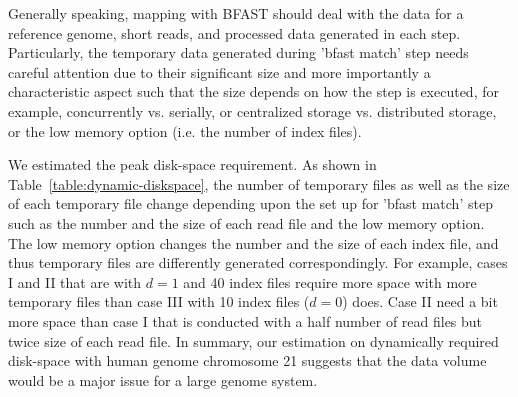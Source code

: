 \documentclass{cpeauth}
\begin{document}



Generally speaking, mapping with BFAST should deal with the data for a
reference genome, short reads, and processed data generated in each
step.  Particularly, the temporary data generated during 'bfast match'
step needs careful attention due to their significant size and more
importantly a characteristic aspect such that the size depends on how
the step is executed, for example, concurrently vs. serially, or
centralized storage vs. distributed storage, or the low memory option
(i.e. the number of index files).

We estimated the peak disk-space requirement.  As shown
in Table~\ref{table:dynamic-diskspace}, the number of temporary files as
well as the size of each temporary file change depending upon the set
up for 'bfast match' step such as the number and the size of each read
file and the low memory option.  The low memory option changes the number and the size
of each index file, and thus temporary files are differently generated correspondingly.  For example, cases I and II that
are with $d=1$ and 40 index files require more space with more
temporary files than case III with 10 index files ($d=0$) does. Case
II need a bit more space than case I that is conducted with a half
number of read files but twice size of each read file.  In summary, our estimation on dynamically required disk-space with human
genome chromosome 21 suggests that the data volume would be a major
issue for a large genome system.
   
\end{document}
